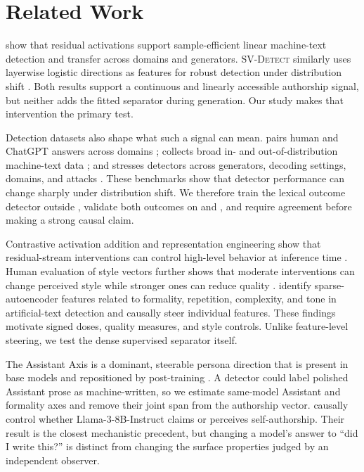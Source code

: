 \section{Related Work}
\label{sec:related}

 \citet{quaremba2026linear} show that residual activations support sample-efficient linear machine-text detection and transfer across domains and generators. \textsc{SV-Detect} similarly uses layerwise logistic directions as features for robust detection under distribution shift \cite{vishnyakov2026svdetect}. Both results support a continuous and linearly accessible authorship signal, but neither adds the fitted separator during generation. Our study makes that intervention the primary test.

Detection datasets also shape what such a signal can mean. \hcThree pairs human and ChatGPT answers across domains \cite{guo2023close}; \mage collects broad in- and out-of-distribution machine-text data \cite{li2024mage}; and \raid stresses detectors across generators, decoding settings, domains, and attacks \cite{dugan2024raid}. These benchmarks show that detector performance can change sharply under distribution shift. We therefore train the lexical outcome detector outside \hape, validate both outcomes on \mage and \raid, and require agreement before making a strong causal claim.

 Contrastive activation addition and representation engineering show that residual-stream interventions can control high-level behavior at inference time \cite{turner2023steering,zou2023representation}. Human evaluation of style vectors further shows that moderate interventions can change perceived style while stronger ones can reduce quality \cite{diallo2026effectiveness}. \citet{kuznetsov2025feature} identify sparse-autoencoder features related to formality, repetition, complexity, and tone in artificial-text detection and causally steer individual features. These findings motivate signed doses, quality measures, and style controls. Unlike feature-level steering, we test the dense supervised separator itself.

 The Assistant Axis is a dominant, steerable persona direction that is present in base models and repositioned by post-training \cite{lu2026assistant}. A detector could label polished Assistant prose as machine-written, so we estimate same-model Assistant and formality axes and remove their joint span from the authorship vector. \citet{ackerman2025inspection} causally control whether Llama-3-8B-Instruct claims or perceives self-authorship. Their result is the closest mechanistic precedent, but changing a model's answer to ``did I write this?'' is distinct from changing the surface properties judged by an independent observer.

